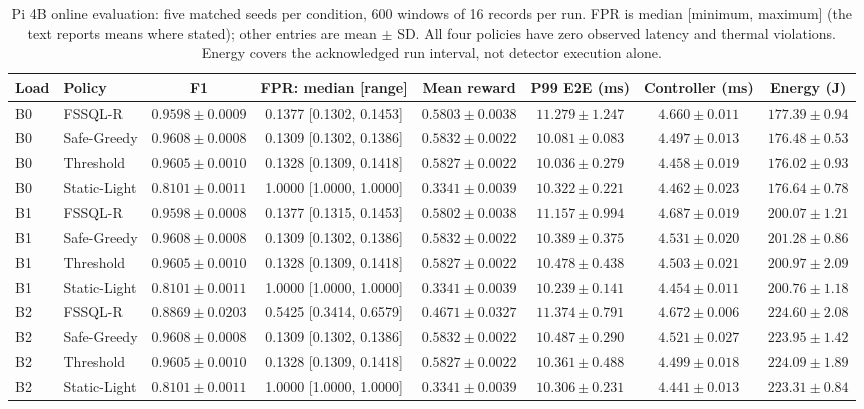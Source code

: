 \documentclass[journal]{IEEEtran}
\begin{document}
\begin{table}[t]
\caption{Pi 4B online evaluation: five matched seeds per condition, 600 windows of 16 records per run. FPR is median [minimum, maximum] (the text reports means where stated); other entries are mean $\pm$ SD. All four policies have zero observed latency and thermal violations. Energy covers the acknowledged run interval, not detector execution alone.}
\label{tab:pi4online}
\centering\footnotesize
\setlength{\tabcolsep}{4pt}
\begin{tabular}{@{}llcccccc@{}}
\toprule
Load & Policy & F1 & FPR: median [range] & Mean reward & P99 E2E (ms) & Controller (ms) & Energy (J) \\
\midrule
B0 & FSSQL-R & $0.9598\pm0.0009$ & 0.1377 [0.1302, 0.1453] & $0.5803\pm0.0038$ & $11.279\pm1.247$ & $4.660\pm0.011$ & $177.39\pm0.94$ \\
B0 & Safe-Greedy & $0.9608\pm0.0008$ & 0.1309 [0.1302, 0.1386] & $0.5832\pm0.0022$ & $10.081\pm0.083$ & $4.497\pm0.013$ & $176.48\pm0.53$ \\
B0 & Threshold & $0.9605\pm0.0010$ & 0.1328 [0.1309, 0.1418] & $0.5827\pm0.0022$ & $10.036\pm0.279$ & $4.458\pm0.019$ & $176.02\pm0.93$ \\
B0 & Static-Light & $0.8101\pm0.0011$ & 1.0000 [1.0000, 1.0000] & $0.3341\pm0.0039$ & $10.322\pm0.221$ & $4.462\pm0.023$ & $176.64\pm0.78$ \\
\midrule
B1 & FSSQL-R & $0.9598\pm0.0008$ & 0.1377 [0.1315, 0.1453] & $0.5802\pm0.0038$ & $11.157\pm0.994$ & $4.687\pm0.019$ & $200.07\pm1.21$ \\
B1 & Safe-Greedy & $0.9608\pm0.0008$ & 0.1309 [0.1302, 0.1386] & $0.5832\pm0.0022$ & $10.389\pm0.375$ & $4.531\pm0.020$ & $201.28\pm0.86$ \\
B1 & Threshold & $0.9605\pm0.0010$ & 0.1328 [0.1309, 0.1418] & $0.5827\pm0.0022$ & $10.478\pm0.438$ & $4.503\pm0.021$ & $200.97\pm2.09$ \\
B1 & Static-Light & $0.8101\pm0.0011$ & 1.0000 [1.0000, 1.0000] & $0.3341\pm0.0039$ & $10.239\pm0.141$ & $4.454\pm0.011$ & $200.76\pm1.18$ \\
\midrule
B2 & FSSQL-R & $0.8869\pm0.0203$ & 0.5425 [0.3414, 0.6579] & $0.4671\pm0.0327$ & $11.374\pm0.791$ & $4.672\pm0.006$ & $224.60\pm2.08$ \\
B2 & Safe-Greedy & $0.9608\pm0.0008$ & 0.1309 [0.1302, 0.1386] & $0.5832\pm0.0022$ & $10.487\pm0.290$ & $4.521\pm0.027$ & $223.95\pm1.42$ \\
B2 & Threshold & $0.9605\pm0.0010$ & 0.1328 [0.1309, 0.1418] & $0.5827\pm0.0022$ & $10.361\pm0.488$ & $4.499\pm0.018$ & $224.09\pm1.89$ \\
B2 & Static-Light & $0.8101\pm0.0011$ & 1.0000 [1.0000, 1.0000] & $0.3341\pm0.0039$ & $10.306\pm0.231$ & $4.441\pm0.013$ & $223.31\pm0.84$ \\
\bottomrule
\end{tabular}
\end{table}
\end{document}
